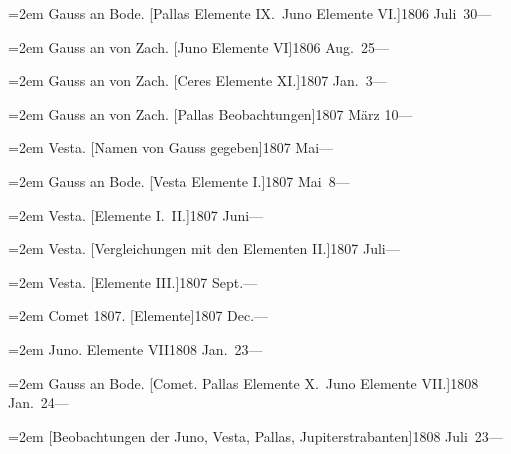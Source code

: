 \documentclass[12pt,a4paper]{article}
\begin{document}
{{{{\vspace{0.5mm}
\noindent\hangindent=2em
Gauss an Bode. [Pallas Elemente IX.\ Juno Elemente VI.]\hfill 1806 Juli\ 30\quad ---

\vspace{0.5mm}
\noindent\hangindent=2em
Gauss an von Zach. [Juno Elemente VI]\hfill 1806 Aug.\ 25\quad ---

\vspace{0.5mm}
\noindent\hangindent=2em
Gauss an von Zach. [Ceres Elemente XI.]\hfill 1807 Jan.\ 3\quad ---

\vspace{0.5mm}
\noindent\hangindent=2em
Gauss an von Zach. [Pallas Beobachtungen]\hfill 1807 M\"arz 10\quad ---

\vspace{0.5mm}
\noindent\hangindent=2em
Vesta. [Namen von Gauss gegeben]\hfill 1807 Mai\quad ---

\vspace{0.5mm}
\noindent\hangindent=2em
Gauss an Bode. [Vesta Elemente I.]\hfill 1807 Mai\ 8\quad ---

\vspace{0.5mm}
\noindent\hangindent=2em
Vesta. [Elemente I.\ II.]\hfill 1807 Juni\quad ---

\vspace{0.5mm}
\noindent\hangindent=2em
Vesta. [Vergleichungen mit den Elementen II.]\hfill 1807 Juli\quad ---

\vspace{0.5mm}
\noindent\hangindent=2em
Vesta. [Elemente III.]\hfill 1807 Sept.\quad ---

\vspace{0.5mm}
\noindent\hangindent=2em
Comet 1807. [Elemente]\hfill 1807 Dec.\quad ---

\vspace{0.5mm}
\noindent\hangindent=2em
Juno. Elemente VII\hfill 1808 Jan.\ 23\quad ---

\vspace{0.5mm}
\noindent\hangindent=2em
Gauss an Bode. [Comet. Pallas Elemente X.\ Juno Elemente VII.]\hfill 1808 Jan.\ 24\quad ---

\vspace{0.5mm}
\noindent\hangindent=2em
[Beobachtungen der Juno, Vesta, Pallas, Jupiterstrabanten]\hfill 1808 Juli\ 23\quad ---

}}}}
\end{document}
